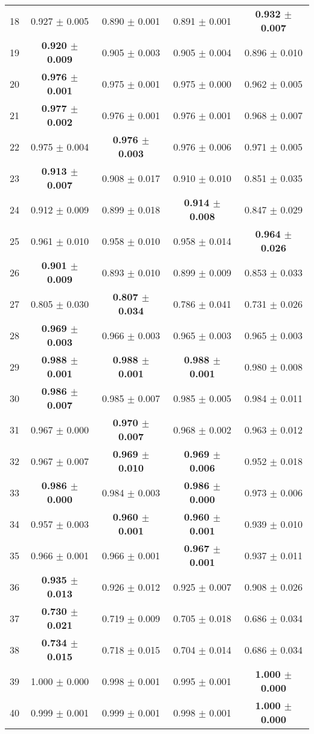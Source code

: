 \begin{table}[!ht]
{\begin{tabular}{r c c c c}
18 & 0.927 $\pm$ 0.005 & 0.890 $\pm$ 0.001 & 0.891 $\pm$ 0.001 & \textbf{0.932 $\pm$ 0.007} \\
19 & \textbf{0.920 $\pm$ 0.009} & 0.905 $\pm$ 0.003 & 0.905 $\pm$ 0.004 & 0.896 $\pm$ 0.010 \\
20 & \textbf{0.976 $\pm$ 0.001} & 0.975 $\pm$ 0.001 & 0.975 $\pm$ 0.000 & 0.962 $\pm$ 0.005 \\
21 & \textbf{0.977 $\pm$ 0.002} & 0.976 $\pm$ 0.001 & 0.976 $\pm$ 0.001 & 0.968 $\pm$ 0.007 \\
22 & 0.975 $\pm$ 0.004 & \textbf{0.976 $\pm$ 0.003} & 0.976 $\pm$ 0.006 & 0.971 $\pm$ 0.005 \\
23 & \textbf{0.913 $\pm$ 0.007} & 0.908 $\pm$ 0.017 & 0.910 $\pm$ 0.010 & 0.851 $\pm$ 0.035 \\
24 & 0.912 $\pm$ 0.009 & 0.899 $\pm$ 0.018 & \textbf{0.914 $\pm$ 0.008} & 0.847 $\pm$ 0.029 \\
25 & 0.961 $\pm$ 0.010 & 0.958 $\pm$ 0.010 & 0.958 $\pm$ 0.014 & \textbf{0.964 $\pm$ 0.026} \\
26 & \textbf{0.901 $\pm$ 0.009} & 0.893 $\pm$ 0.010 & 0.899 $\pm$ 0.009 & 0.853 $\pm$ 0.033 \\
27 & 0.805 $\pm$ 0.030 & \textbf{0.807 $\pm$ 0.034} & 0.786 $\pm$ 0.041 & 0.731 $\pm$ 0.026 \\
28 & \textbf{0.969 $\pm$ 0.003} & 0.966 $\pm$ 0.003 & 0.965 $\pm$ 0.003 & 0.965 $\pm$ 0.003 \\
29 & \textbf{0.988 $\pm$ 0.001} & \textbf{0.988 $\pm$ 0.001} & \textbf{0.988 $\pm$ 0.001} & 0.980 $\pm$ 0.008 \\
30 & \textbf{0.986 $\pm$ 0.007} & 0.985 $\pm$ 0.007 & 0.985 $\pm$ 0.005 & 0.984 $\pm$ 0.011 \\
31 & 0.967 $\pm$ 0.000 & \textbf{0.970 $\pm$ 0.007} & 0.968 $\pm$ 0.002 & 0.963 $\pm$ 0.012 \\
32 & 0.967 $\pm$ 0.007 & \textbf{0.969 $\pm$ 0.010} & \textbf{0.969 $\pm$ 0.006} & 0.952 $\pm$ 0.018 \\
33 & \textbf{0.986 $\pm$ 0.000} & 0.984 $\pm$ 0.003 & \textbf{0.986 $\pm$ 0.000} & 0.973 $\pm$ 0.006 \\
34 & 0.957 $\pm$ 0.003 & \textbf{0.960 $\pm$ 0.001} & \textbf{0.960 $\pm$ 0.001} & 0.939 $\pm$ 0.010 \\
35 & 0.966 $\pm$ 0.001 & 0.966 $\pm$ 0.001 & \textbf{0.967 $\pm$ 0.001} & 0.937 $\pm$ 0.011 \\
36 & \textbf{0.935 $\pm$ 0.013} & 0.926 $\pm$ 0.012 & 0.925 $\pm$ 0.007 & 0.908 $\pm$ 0.026 \\
37 & \textbf{0.730 $\pm$ 0.021} & 0.719 $\pm$ 0.009 & 0.705 $\pm$ 0.018 & 0.686 $\pm$ 0.034 \\
38 & \textbf{0.734 $\pm$ 0.015} & 0.718 $\pm$ 0.015 & 0.704 $\pm$ 0.014 & 0.686 $\pm$ 0.034 \\
39 & 1.000 $\pm$ 0.000 & 0.998 $\pm$ 0.001 & 0.995 $\pm$ 0.001 & \textbf{1.000 $\pm$ 0.000} \\
40 & 0.999 $\pm$ 0.001 & 0.999 $\pm$ 0.001 & 0.998 $\pm$ 0.001 & \textbf{1.000 $\pm$ 0.000} \\
\end{tabular}}
\end{table}

